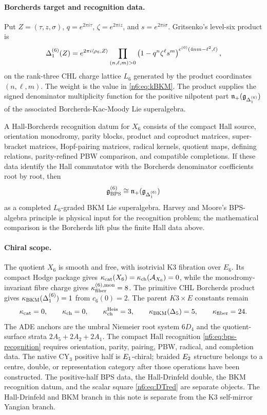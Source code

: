 \paragraph{Borcherds target and recognition data.}
Put $Z=(\tau,z,\sigma)$,
$q=e^{2\pi i\tau}$, $\zeta=e^{2\pi iz}$, and $s=e^{2\pi i\sigma}$.
Gritsenko's level-six product is
\begin{equation}
   \Delta_{1}^{(6)}(Z)
   =
   e^{2\pi i\langle\rho_6,Z\rangle}
   \prod_{(n,\ell,m)>0}
   \left(1-q^n\zeta^\ell s^m\right)^{
     c^{(6)}(4nm-\ell^2,\ell)} ,
   \label{n6:eq:borcherds-product}
\end{equation}
on the rank-three CHL charge lattice $L_6$ generated by the product
coordinates $(n,\ell,m)$. The weight is the value in
\eqref{n6:eq:kBKM}. The product supplies the signed denominator
multiplicity function for the positive nilpotent part
$\mathfrak{n}_+(\mathfrak{g}_{\Delta_{1}^{(6)}})$ of the associated Borcherds-Kac-Moody Lie
superalgebra.

A Hall-Borcherds recognition datum for $X_6$ consists of the compact
Hall source, orientation monodromy, parity blocks, product and coproduct
matrices, super-bracket matrices, Hopf-pairing matrices, radical
kernels, quotient maps, defining relations, parity-refined PBW
comparison, and compatible completions. If these data identify the Hall
commutator with the Borcherds denominator coefficients root by root, then
\begin{equation}
   \mathfrak{g}^{(6)}_{\mathrm{BPS}}
   \cong
   \mathfrak{n}_+(\mathfrak{g}_{\Delta_{1}^{(6)}})
   \label{n6:eq:bps-recognition}
 \end{equation}
as a completed $L_6$-graded BKM Lie superalgebra. Harvey and Moore's
BPS-algebra principle is physical input for the recognition problem; the
mathematical comparison is the Borcherds lift plus the finite Hall data
above.

\paragraph{Chiral scope.}
The quotient $X_6$ is smooth and free, with isotrivial K3 fibration over
$E_6$. Its compact Hodge package gives
$\kappa_{\mathrm{cat}}(X_6)=\kappa_{\mathrm{ch}}(\mathcal{A}_{X_6})=0$, while the monodromy-invariant fibre
charge gives $\kappa_{\mathrm{fiber}}^{(6),\mathrm{mon}}=8$. The primitive CHL
Borcherds product gives $\kappa_{\mathrm{BKM}}(\Delta_{1}^{(6)})=1$ from $c_6(0)=2$. The
parent $K3\times E$ constants remain
\[
  \kappa_{\mathrm{cat}}=0,\qquad
  \kappa_{\mathrm{ch}}=0,\qquad
  \kappa_{\mathrm{ch}}^{\mathrm{Heis}}=3,\qquad
  \kappa_{\mathrm{BKM}}(\Delta_5)=5,\qquad
  \kappa_{\mathrm{fiber}}=24.
\]
The ADE anchors are the umbral Niemeier root system $6D_4$ and the
quotient-surface strata $2A_5+2A_2+2A_1$. The compact Hall recognition
\eqref{n6:eq:bps-recognition} requires orientation, parity, pairing,
PBW, radical, and completion data. The native CY$_3$ positive half is
$E_1$-chiral; braided $E_2$ structure belongs to a centre, double,
or representation category after those operations have been constructed.
The positive-half BPS data, the Hall-Drinfeld double, the BKM
recognition datum, and the scalar square \eqref{n6:eq:DTred} are
separate objects. The Hall-Drinfeld and BKM branch in this note is
separate from the K3 self-mirror Yangian branch.
